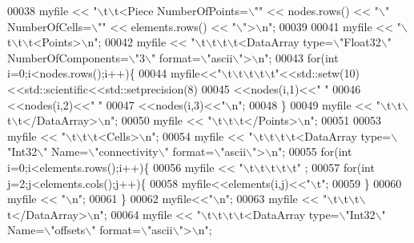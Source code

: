 \begin{DoxyCode}
00038     myfile << \textcolor{stringliteral}{"\(\backslash\)t\(\backslash\)t<Piece NumberOfPoints=\(\backslash\)""} << nodes.rows() << \textcolor{stringliteral}{"\(\backslash\)" NumberOfCells=\(\backslash\)""} << elements.rows() <<
       \textcolor{stringliteral}{"\(\backslash\)">\(\backslash\)n"};
00039 
00041     myfile << \textcolor{stringliteral}{"\(\backslash\)t\(\backslash\)t\(\backslash\)t<Points>\(\backslash\)n"};
00042     myfile << \textcolor{stringliteral}{"\(\backslash\)t\(\backslash\)t\(\backslash\)t\(\backslash\)t<DataArray type=\(\backslash\)"Float32\(\backslash\)" NumberOfComponents=\(\backslash\)"3\(\backslash\)" format=\(\backslash\)"ascii\(\backslash\)">\(\backslash\)n"};
00043     \textcolor{keywordflow}{for}(\textcolor{keywordtype}{int} i=0;i<nodes.rows();i++)\{
00044     myfile<<\textcolor{stringliteral}{"\(\backslash\)t\(\backslash\)t\(\backslash\)t\(\backslash\)t\(\backslash\)t"}<<std::setw(10)<<std::scientific<<std::setprecision(8)
00045         <<nodes(i,1)<<\textcolor{stringliteral}{" "}
00046         <<nodes(i,2)<<\textcolor{stringliteral}{" "}
00047         <<nodes(i,3)<<\textcolor{stringliteral}{"\(\backslash\)n"};
00048     \}
00049     myfile << \textcolor{stringliteral}{"\(\backslash\)t\(\backslash\)t\(\backslash\)t\(\backslash\)t</DataArray>\(\backslash\)n"};
00050     myfile << \textcolor{stringliteral}{"\(\backslash\)t\(\backslash\)t\(\backslash\)t</Points>\(\backslash\)n"};
00051 
00053     myfile << \textcolor{stringliteral}{"\(\backslash\)t\(\backslash\)t\(\backslash\)t<Cells>\(\backslash\)n"};
00054     myfile << \textcolor{stringliteral}{"\(\backslash\)t\(\backslash\)t\(\backslash\)t\(\backslash\)t<DataArray type=\(\backslash\)"Int32\(\backslash\)" Name=\(\backslash\)"connectivity\(\backslash\)" format=\(\backslash\)"ascii\(\backslash\)">\(\backslash\)n"};
00055     \textcolor{keywordflow}{for}(\textcolor{keywordtype}{int} i=0;i<elements.rows();i++)\{
00056                 myfile << \textcolor{stringliteral}{"\(\backslash\)t\(\backslash\)t\(\backslash\)t\(\backslash\)t\(\backslash\)t"} ;
00057                 \textcolor{keywordflow}{for}(\textcolor{keywordtype}{int} j=2;j<elements.cols();j++)\{
00058                           myfile<<elements(i,j)<<\textcolor{stringliteral}{"\(\backslash\)t"};
00059                 \}
00060     myfile << \textcolor{stringliteral}{"\(\backslash\)n"};
00061     \}
00062     myfile<<\textcolor{stringliteral}{"\(\backslash\)n"};
00063     myfile << \textcolor{stringliteral}{"\(\backslash\)t\(\backslash\)t\(\backslash\)t\(\backslash\)t</DataArray>\(\backslash\)n"};
00064     myfile << \textcolor{stringliteral}{"\(\backslash\)t\(\backslash\)t\(\backslash\)t\(\backslash\)t<DataArray type=\(\backslash\)"Int32\(\backslash\)" Name=\(\backslash\)"offsets\(\backslash\)" format=\(\backslash\)"ascii\(\backslash\)">\(\backslash\)n"};

\end{DoxyCode}
